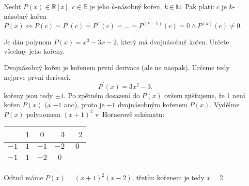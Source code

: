 \begin{veta}
    Nechť $P(x) \in \mathbb R[x], c \in \mathbb R$ je jeho $k$-násobný kořen, $k\in \mathbb N.$ Pak platí: $c$ je
    $k$-násobný kořen $P(x) \iff P(c)=P^\prime(c)=P^{\prime \prime}(c)=\dots= P^{(k-1)}(c)=0 \land P^{(k)}(c)\ne 0$.
\end{veta}


\begin{priklad}
Je dán polynom $P(x)=x^3-3x-2$, který má dvojnásobný kořen.
Určete všechny jeho kořeny.
\end{priklad}

\begin{reseni}
Dvojnásobný kořen je kořenem první derivace (ale ne naopak). Určeme tedy nejprve první derivaci.
\begin{equation*}
	P^\prime(x)=3x^2-3,
\end{equation*}
kořeny jsou tedy $\pm 1$. Po zpětném dosazení do $P(x)$ ovšem zjišťujeme, že 1 není kořen $P(x)$
(a $-1$ ano), proto je $-1$ dvojnásobným kořenem $P(x)$. Vydělme $P(x)$ polynomem $(x+1)^2$ v~Hornerově
schématu:
\begin{center}
	\begin{tabular}{c | c c c c}
		\, & $1$ & $0$ & $-3$ & $-2$\\
		\hline
		$-1$ & $1$ & $-1$ & $-2$ & $0$\\
		\hline
		$-1$ & $1$ & $-2$ & $0$ & \,\\
	\end{tabular}
\end{center}
Odtud máme $P(x)=(x+1)^2(x-2)$, třetím kořenem je tedy $x=2$.
\end{reseni}
